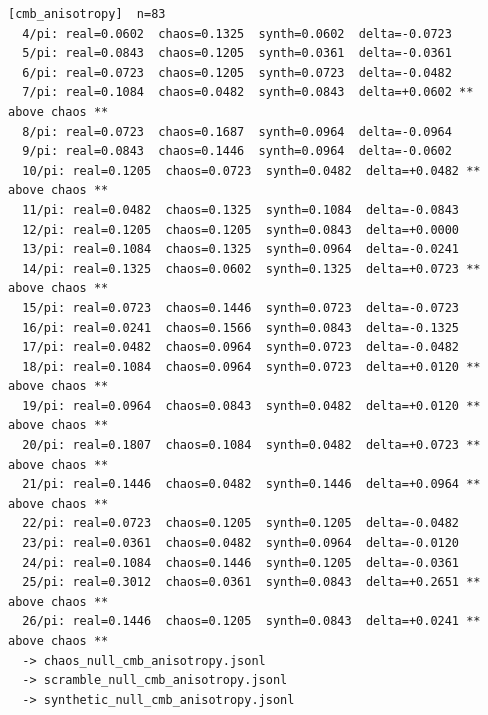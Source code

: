 \documentclass[11pt, letterpaper, openany]{book}
\begin{document}
\begin{empiricalbox}
\begin{lstlisting}[style=terminal]
[cmb_anisotropy]  n=83
  4/pi: real=0.0602  chaos=0.1325  synth=0.0602  delta=-0.0723
  5/pi: real=0.0843  chaos=0.1205  synth=0.0361  delta=-0.0361
  6/pi: real=0.0723  chaos=0.1205  synth=0.0723  delta=-0.0482
  7/pi: real=0.1084  chaos=0.0482  synth=0.0843  delta=+0.0602 ** above chaos **
  8/pi: real=0.0723  chaos=0.1687  synth=0.0964  delta=-0.0964
  9/pi: real=0.0843  chaos=0.1446  synth=0.0964  delta=-0.0602
  10/pi: real=0.1205  chaos=0.0723  synth=0.0482  delta=+0.0482 ** above chaos **
  11/pi: real=0.0482  chaos=0.1325  synth=0.1084  delta=-0.0843
  12/pi: real=0.1205  chaos=0.1205  synth=0.0843  delta=+0.0000
  13/pi: real=0.1084  chaos=0.1325  synth=0.0964  delta=-0.0241
  14/pi: real=0.1325  chaos=0.0602  synth=0.1325  delta=+0.0723 ** above chaos **
  15/pi: real=0.0723  chaos=0.1446  synth=0.0723  delta=-0.0723
  16/pi: real=0.0241  chaos=0.1566  synth=0.0843  delta=-0.1325
  17/pi: real=0.0482  chaos=0.0964  synth=0.0723  delta=-0.0482
  18/pi: real=0.1084  chaos=0.0964  synth=0.0723  delta=+0.0120 ** above chaos **
  19/pi: real=0.0964  chaos=0.0843  synth=0.0482  delta=+0.0120 ** above chaos **
  20/pi: real=0.1807  chaos=0.1084  synth=0.0482  delta=+0.0723 ** above chaos **
  21/pi: real=0.1446  chaos=0.0482  synth=0.1446  delta=+0.0964 ** above chaos **
  22/pi: real=0.0723  chaos=0.1205  synth=0.1205  delta=-0.0482
  23/pi: real=0.0361  chaos=0.0482  synth=0.0964  delta=-0.0120
  24/pi: real=0.1084  chaos=0.1446  synth=0.1205  delta=-0.0361
  25/pi: real=0.3012  chaos=0.0361  synth=0.0843  delta=+0.2651 ** above chaos **
  26/pi: real=0.1446  chaos=0.1205  synth=0.0843  delta=+0.0241 ** above chaos **
  -> chaos_null_cmb_anisotropy.jsonl
  -> scramble_null_cmb_anisotropy.jsonl
  -> synthetic_null_cmb_anisotropy.jsonl


\end{lstlisting}
\end{empiricalbox}
\end{document}
